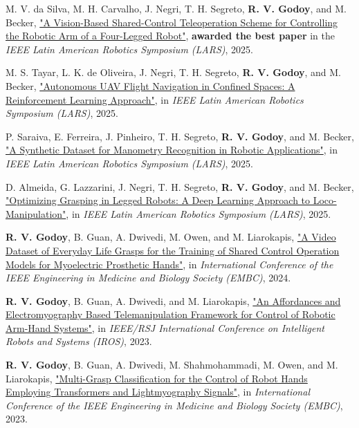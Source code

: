 \begin{cvparagraph}
M. V. da Silva, M. H. Carvalho, J. Negri, T. H. Segreto, \textbf{R. V. Godoy}, and M. Becker, \href{https://ieeexplore.ieee.org/document/11272961}{"A Vision-Based Shared-Control Teleoperation Scheme for Controlling the Robotic Arm of a Four-Legged Robot"}, \textbf{awarded the best paper} in the \textit{IEEE Latin American Robotics Symposium (LARS)}, 2025.

M. S. Tayar, L. K. de Oliveira, J. Negri, T. H. Segreto, \textbf{R. V. Godoy}, and M. Becker, \href{https://ieeexplore.ieee.org/document/11273007}{"Autonomous UAV Flight Navigation in Confined Spaces: A Reinforcement Learning Approach"}, in \textit{IEEE Latin American Robotics Symposium (LARS)}, 2025.

P. Saraiva, E. Ferreira, J. Pinheiro, T. H. Segreto, \textbf{R. V. Godoy}, and M. Becker, \href{https://ieeexplore.ieee.org/document/11272958}{"A Synthetic Dataset for Manometry Recognition in Robotic Applications"}, in \textit{IEEE Latin American Robotics Symposium (LARS)}, 2025.

D. Almeida, G. Lazzarini, J. Negri, T. H. Segreto, \textbf{R. V. Godoy}, and M. Becker, \href{https://ieeexplore.ieee.org/document/11272962}{"Optimizing Grasping in Legged Robots: A Deep Learning Approach to Loco-Manipulation"}, in \textit{IEEE Latin American Robotics Symposium (LARS)}, 2025.

\textbf{R. V. Godoy}, B. Guan, A. Dwivedi, M. Owen, and M. Liarokapis, \href{https://www.researchgate.net/publication/382596938_A_Video_Dataset_of_Everyday_Life_Grasps_for_the_Training_of_Shared_Control_Operation_Models_for_Myoelectric_Prosthetic_Hands}{"A Video Dataset of Everyday Life Grasps for the Training of Shared Control Operation Models for Myoelectric Prosthetic Hands"}, in \textit{International Conference of the IEEE Engineering in Medicine and Biology Society (EMBC)}, 2024.

\textbf{R. V. Godoy}, B. Guan, A. Dwivedi, and M. Liarokapis, \href{https://www.researchgate.net/publication/372861944_An_Affordances_and_Electromyography_Based_Telemanipulation_Framework_for_Control_of_Robotic_Arm-Hand_Systems}{"An Affordances and Electromyography Based Telemanipulation Framework for Control of Robotic Arm-Hand Systems"}, in \textit{IEEE/RSJ International Conference on Intelligent Robots and Systems (IROS)}, 2023.

\textbf{R. V. Godoy}, B. Guan, A. Dwivedi, M. Shahmohammadi, M. Owen, and M. Liarokapis, \href{https://www.researchgate.net/publication/370770180_Multi-Grasp_Classification_for_the_Control_of_Robot_Hands_Employing_Transformers_and_Lightmyography_Signals}{"Multi-Grasp Classification for the Control of Robot Hands Employing Transformers and Lightmyography Signals"}, in \textit{International Conference of the IEEE Engineering in Medicine and Biology Society (EMBC)}, 2023.


\end{cvparagraph}
